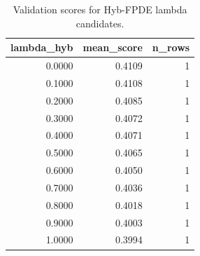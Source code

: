 \begin{table}[t]
\caption{Validation scores for Hyb-FPDE lambda candidates.}
\label{tab:lambda_distribution_computed}
\centering
\begin{tabular}{rrr}
\toprule
lambda\_hyb & mean\_score & n\_rows \\
\midrule
0.0000 & 0.4109 & 1 \\
0.1000 & 0.4108 & 1 \\
0.2000 & 0.4085 & 1 \\
0.3000 & 0.4072 & 1 \\
0.4000 & 0.4071 & 1 \\
0.5000 & 0.4065 & 1 \\
0.6000 & 0.4050 & 1 \\
0.7000 & 0.4036 & 1 \\
0.8000 & 0.4018 & 1 \\
0.9000 & 0.4003 & 1 \\
1.0000 & 0.3994 & 1 \\
\bottomrule
\end{tabular}

\end{table}

